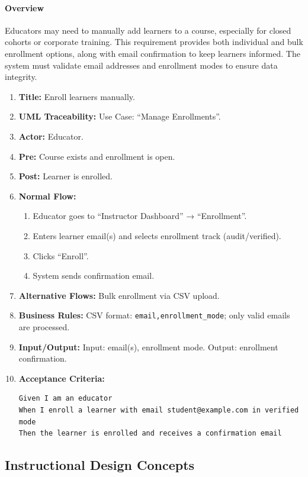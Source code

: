 \paragraph{Overview}
Educators may need to manually add learners to a course, especially for closed cohorts or corporate training. This requirement provides both individual and bulk enrollment options, along with email confirmation to keep learners informed. The system must validate email addresses and enrollment modes to ensure data integrity.
\begin{enumerate}[label=\textbf{\arabic*.}]
\item \textbf{Title:} Enroll learners manually.
\item \textbf{UML Traceability:} Use Case: “Manage Enrollments”.
\item \textbf{Actor:} Educator.
\item \textbf{Pre:} Course exists and enrollment is open.
\item \textbf{Post:} Learner is enrolled.
\item \textbf{Normal Flow:} 
    \begin{enumerate}
        \item Educator goes to “Instructor Dashboard” → “Enrollment”.
        \item Enters learner email(s) and selects enrollment track (audit/verified).
        \item Clicks “Enroll”.
        \item System sends confirmation email.
    \end{enumerate}
\item \textbf{Alternative Flows:} Bulk enrollment via CSV upload.
\item \textbf{Business Rules:} CSV format: \texttt{email,enrollment\_mode}; only valid emails are processed.
\item \textbf{Input/Output:} Input: email(s), enrollment mode. Output: enrollment confirmation.
\item \textbf{Acceptance Criteria:}
    \begin{verbatim}
Given I am an educator
When I enroll a learner with email student@example.com in verified mode
Then the learner is enrolled and receives a confirmation email
    \end{verbatim}
\end{enumerate}

\subsection{Instructional Design Concepts}
